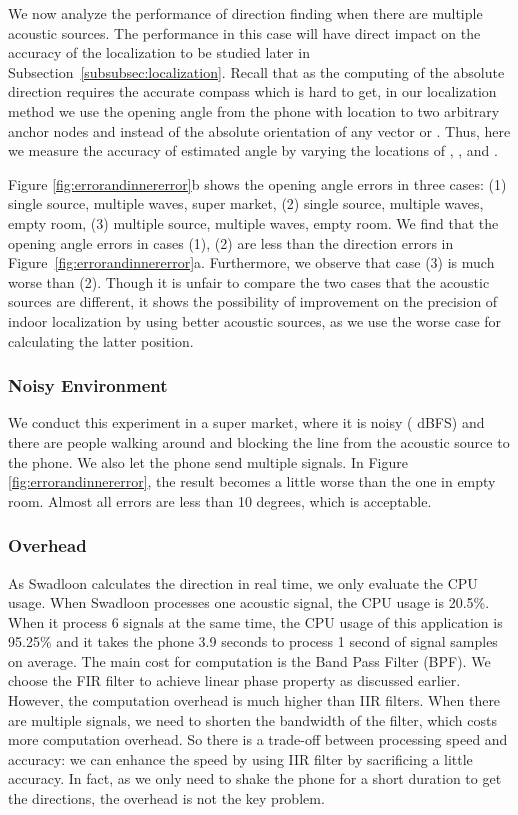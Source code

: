 \documentclass[]{sig-alternate-10pt}
\def \ourprotocol{Swadloon\xspace}
\begin{document}
We now  analyze
 the performance of direction finding when there are multiple acoustic
 sources.
The performance in this case will have direct impact on the accuracy
of the localization to be studied later in
Subsection~\ref{subsubsec:localization}.
Recall that as the computing of the absolute direction requires 
   the accurate compass which is hard to get,
  in our localization method we use the opening angle 
   from the phone with location  to two arbitrary anchor nodes
    and  instead of the absolute orientation of any vector
    or .
Thus, here we measure the accuracy of estimated angle  by varying the locations of , , and .

Figure \ref{fig:errorandinnererror}b shows the opening angle
errors in three cases: (1) single source, multiple waves, super market, (2)
single source, multiple waves, empty room, (3) multiple source,
multiple waves, empty room.
We find that the opening angle  errors in
 cases (1), (2) are less than the direction errors in
 Figure~\ref{fig:errorandinnererror}a.
Furthermore, we observe that case (3) is much worse
 than (2).
Though it is unfair to compare the two cases that the
 acoustic sources are different, it shows the possibility of  improvement on the
 precision of indoor localization by using better acoustic sources, as
 we use the worse case for  calculating the latter position.

\subsubsection{Noisy Environment}
We conduct this experiment in a super market, where it is noisy ( dBFS) and there
 are people walking around and blocking the line from the acoustic source to the
 phone.
We also let the phone send multiple signals.  In Figure \ref{fig:errorandinnererror},
the result becomes a little worse than the one in empty room. Almost
all errors are less than 10 degrees, which is acceptable.


\subsubsection{Overhead}
As \ourprotocol calculates the direction in real time, we only
evaluate the CPU usage. When \ourprotocol processes
one acoustic signal, the CPU usage is 20.5\%. When it process
6 signals at the same time, the CPU usage of this application is
95.25\% and it takes the phone
3.9 seconds to process 1 second of signal samples on average. The main cost
for computation is the Band Pass Filter (BPF). We choose the FIR filter to
achieve linear phase property as discussed earlier. However, the
computation overhead is much higher than IIR filters. When there are
multiple signals, we need to shorten the bandwidth of the filter,
which costs more computation overhead. So there is a trade-off between
processing speed and accuracy:  we can enhance the speed by using IIR filter by sacrificing
a little accuracy. In fact, as we only need to shake the phone for a short duration to
get the directions, the overhead is not the key problem.
\end{document}
